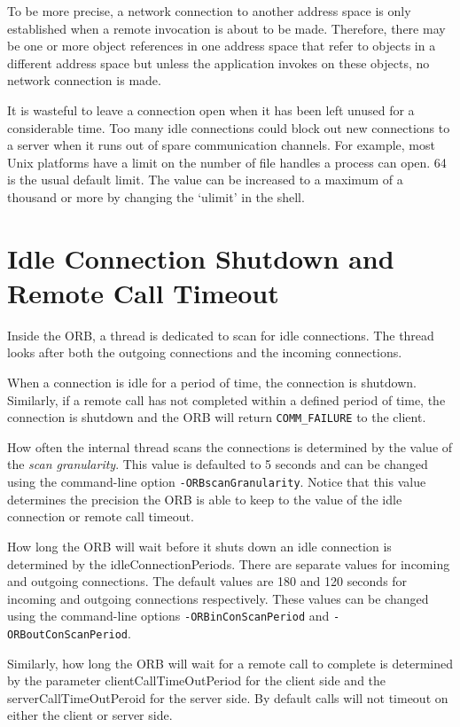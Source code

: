 \documentclass[11pt,twoside,a4paper]{book}
\newcommand{\code}[1]{\texttt{#1}}
\begin{document}
To be more precise, a network connection to another address space is
only established when a remote invocation is about to be made.
Therefore, there may be one or more object references in one address
space that refer to objects in a different address space but unless
the application invokes on these objects, no network connection is
made.

It is wasteful to leave a connection open when it has been left unused
for a considerable time. Too many idle connections could block out new
connections to a server when it runs out of spare communication
channels. For example, most Unix platforms have a limit on the number
of file handles a process can open. 64 is the usual default limit. The
value can be increased to a maximum of a thousand or more by changing
the `ulimit' in the shell.

\section{Idle Connection Shutdown and Remote Call Timeout}
\label{sec:shut}

Inside the ORB, a thread is dedicated to scan for idle connections.
The thread looks after both the outgoing connections and the incoming
connections.

When a connection is idle for a period of time, the connection is
shutdown. Similarly, if a remote call has not completed within a
defined period of time, the connection is shutdown and the ORB will
return \code{COMM\_FAILURE} to the client.

How often the internal thread scans the connections is determined by
the value of the \emph{scan granularity}. This value is defaulted to 5
seconds and can be changed using the command-line option
\texttt{-ORBscanGranularity}. Notice that this value determines the
precision the ORB is able to keep to the value of the idle connection
or remote call timeout.

How long the ORB will wait before it shuts down an idle connection is
determined by the idleConnectionPeriods. There are separate values for
incoming and outgoing connections. The default values are 180 and 120
seconds for incoming and outgoing connections respectively. These
values can be changed using the command-line options
\texttt{-ORBinConScanPeriod} and \texttt{-ORBoutConScanPeriod}.

Similarly, how long the ORB will wait for a remote call to complete is
determined by the parameter clientCallTimeOutPeriod for the client
side and the serverCallTimeOutPeroid for the server side. By default
calls will not timeout on either the client or server side.
\end{document}
